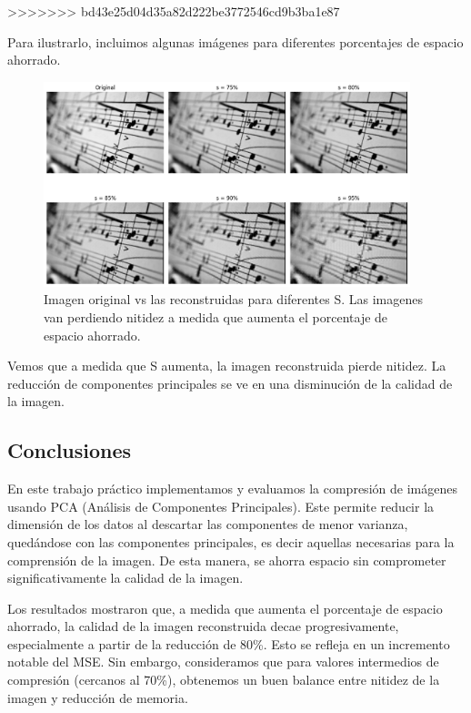 \documentclass[a4paper,12pt]{article}
\begin{document}
\vspace{1em}
>>>>>>> bd43e25d04d35a82d222be3772546cd9b3ba1e87

Para ilustrarlo, incluimos algunas imágenes para diferentes porcentajes de espacio ahorrado. 
\begin{figure}[H]
    \centering
    \includegraphics[width=0.95\textwidth]{Ejercicio 4b.png}
    \caption{Imagen original vs las reconstruidas para diferentes S. Las imagenes van perdiendo nitidez a medida que aumenta el porcentaje de espacio ahorrado.}
    \label{fig:ej4b}
\end{figure}

Vemos que a medida que S aumenta, la imagen reconstruida pierde nitidez. La reducción de 
componentes principales se ve en una disminución de la calidad de la imagen. 

\newpage
\subsection*{Conclusiones}
En este trabajo práctico implementamos y evaluamos la compresión de imágenes usando 
PCA (Análisis de Componentes Principales). Este permite reducir la dimensión de los datos
al descartar las componentes de menor varianza, quedándose con las componentes principales, 
es decir aquellas necesarias para la comprensión de la imagen. De esta manera, se ahorra espacio 
sin comprometer significativamente la calidad de la imagen.

\vspace{1em}

Los resultados mostraron que, a medida que aumenta el porcentaje de espacio ahorrado, la calidad
de la imagen reconstruida decae progresivamente, especialmente a partir de la reducción de 80\%. 
Esto se refleja en un incremento notable del MSE. Sin embargo, consideramos que
para valores intermedios de compresión (cercanos al 70\%), obtenemos un buen balance entre nitidez 
de la imagen y reducción de memoria. 
\end{document}
